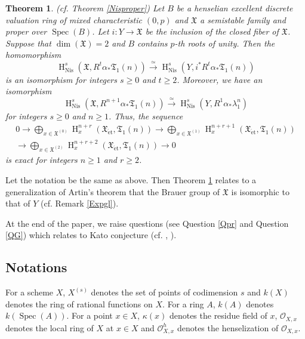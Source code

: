 \documentclass{article}
\newtheorem{thm}{\indent \sc Theorem}[section]
\newcommand{\spec}{\operatorname{Spec}}
\newcommand{\et}{\mathrm{\acute{e}t}}
\newcommand{\Nis}{\mathrm{Nis}}
\newcommand{\HO}{\operatorname{H}}
\begin{document}
%
\begin{thm}\upshape\label{IntNisproper}(cf. Theorem \ref{Nisproper})
Let $B$ be a henselian excellent discrete valuation ring of mixed characteristic 
$(0, p)$
and $\mathfrak{X}$ a semistable family and proper over $\spec(B)$.
Let $i: Y\to \mathfrak{X}$ be the inclusion of 
the closed fiber of $\mathfrak{X}$.
Suppose that
$\operatorname{dim}(\mathfrak{X})=2$
and
$B$ contains $p$-th roots of unity.
Then the homomorphism
%
\begin{equation*}%
\HO^{s}_{\Nis}(\mathfrak{X}, 
R^{t}\alpha_{*}\mathfrak{T}_{1}(n)
)
\xrightarrow{\simeq}
\HO^{s}_{\Nis}(Y, 
i^{*}R^{t}\alpha_{*}\mathfrak{T}_{1}(n)
)
\end{equation*}
%
is an isomorphism for integers $s\geq 0$ and $t\geq 2$. 
Moreover, we have an isomorphism
%
\begin{equation*}%
\HO^{s}_{\Nis}(\mathfrak{X}, 
R^{n+1}\alpha_{*}\mathfrak{T}_{1}(n)
)
\xrightarrow{\simeq}
\HO^{s}_{\Nis}
(Y, R^{1}\alpha_{*}\lambda_{1}^{n}
)
\end{equation*}
%
for integers $s\geq 0$ and $n\geq 1$. Thus, the sequence
%
\begin{align*}%
0\to  
\displaystyle\bigoplus_{x\in \mathfrak{X}^{(0)}}
\HO_{x}^{n+r}(\mathfrak{X}_{\et}, \mathfrak{T}_{1}(n))
\to
\displaystyle\bigoplus_{x\in \mathfrak{X}^{(1)}}
\HO_{x}^{n+r+1}(\mathfrak{X}_{\et}, \mathfrak{T}_{1}(n))
\nonumber
\\
\to
\displaystyle\bigoplus_{x\in \mathfrak{X}^{(2)}}
\HO_{x}^{n+r+2}(\mathfrak{X}_{\et}, \mathfrak{T}_{1}(n))
\to
0
\end{align*}
%
is exact for integers $n\geq 1$ and $r\geq 2$.
\end{thm}
%

Let the notation be the same as above. Then Theorem \ref{IntNisproper}
relates to a generalization of Artin's theorem that
the Brauer group of $\mathfrak{X}$
is isomorphic to that of $Y$ (cf. Remark \ref{Expgl}).

At the end of the paper, we raise questions 
(see Question \ref{Qpr} and Question \ref{QG})
which relates to Kato conjecture 
(cf. \cite{K}, \cite[p.125, Conjecture 0.2 and Conjecture 0.3]{K-S}).

%
\subsection*{Notations}
%
For a scheme $X$,
$X^{(s)}$ denotes the set of points
of codimension $s$ and
$k(X)$ denotes the ring of rational functions on $X$.
For a ring $A$, $k(A)$ denotes $k(\spec(A))$.
For a point $x\in X$, $\kappa(x)$ denotes the residue field
of $x$, $\mathcal{O}_{X, x}$ denotes the local ring of $X$ at $x\in X$
and
$\mathcal{O}^{h}_{X, x}$ denotes the henselization of $\mathcal{O}_{X, x}$.
\end{document}
